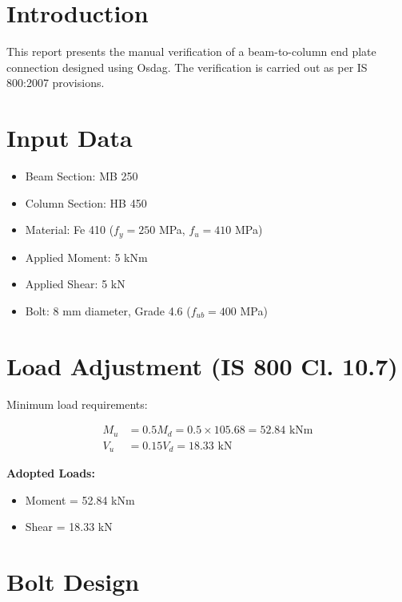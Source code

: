 





\maketitle

\section{Introduction}
This report presents the manual verification of a beam-to-column end plate connection designed using Osdag. The verification is carried out as per IS 800:2007 provisions.

\section{Input Data}
\begin{itemize}
    \item Beam Section: MB 250
    \item Column Section: HB 450
    \item Material: Fe 410 ($f_y = 250$ MPa, $f_u = 410$ MPa)
    \item Applied Moment: 5 kNm
    \item Applied Shear: 5 kN
    \item Bolt: 8 mm diameter, Grade 4.6 ($f_{ub} = 400$ MPa)
\end{itemize}

\section{Load Adjustment (IS 800 Cl. 10.7)}
Minimum load requirements:

\begin{align}
M_u &= 0.5 M_d = 0.5 \times 105.68 = 52.84 \text{ kNm} \\
V_u &= 0.15 V_d = 18.33 \text{ kN}
\end{align}

\textbf{Adopted Loads:}
\begin{itemize}
    \item Moment = 52.84 kNm
    \item Shear = 18.33 kN
\end{itemize}

\section{Bolt Design}

